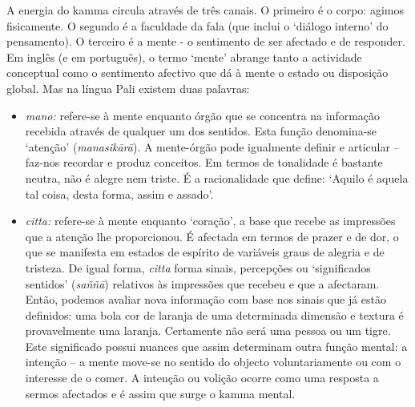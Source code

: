 A energia do kamma circula através de três canais. O primeiro é o corpo: agimos
fisicamente. O segundo é a faculdade da fala (que inclui o `diálogo interno' do
pensamento). O terceiro é a mente - o sentimento de ser afectado e de responder.
Em inglês (e em português), o termo `mente' abrange tanto a actividade
conceptual como o sentimento afectivo que dá à mente o estado ou disposição
global. Mas na língua Pali existem duas palavras:

\enlargethispage{\baselineskip}

\begin{itemize}

  \item \emph{mano:} refere-se à mente enquanto órgão que se concentra na
        informação recebida através de qualquer um dos sentidos. Esta função
        denomina-se `atenção' (\emph{manasikārā}). A mente-órgão pode igualmente
        definir e articular -- faz-nos recordar e produz conceitos. Em termos de
        tonalidade é bastante neutra, não é alegre nem triste. É a racionalidade
        que define: `Aquilo é aquela tal coisa, desta forma, assim e assado'.

  \item \emph{citta:} refere-se à mente enquanto `coração', a base que recebe
        as impressões que a atenção lhe proporcionou. É afectada em termos de
        prazer e de dor, o que se manifesta em estados de espírito de variáveis
        graus de alegria e de tristeza. De igual forma, \emph{citta} forma
        sinais, percepções ou `significados sentidos' (\emph{saññā}) relativos
        às impressões que recebeu e que a afectaram. Então, podemos avaliar nova
        informação com base nos sinais que já estão definidos: uma bola cor de
        laranja de uma determinada dimensão e textura é provavelmente uma
        laranja. Certamente não será uma pessoa ou um tigre. Este significado
        possui nuances que assim determinam outra função mental: a intenção -- a
        mente move-se no sentido do objecto voluntariamente ou com o interesse
        de o comer. A intenção ou volição ocorre como uma resposta a sermos
        afectados e é assim que surge o kamma mental.

\end{itemize}

\enlargethispage{\baselineskip}

